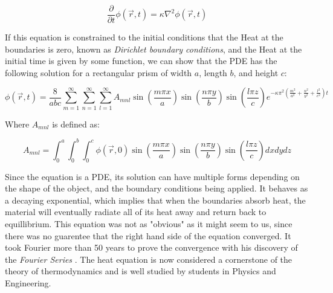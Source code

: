 \documentclass[letterpaper, 12pt]{article}
\begin{document}
         \begin{equation}
            \frac{\partial}{\partial t} \phi (\vec{r}, t) = \kappa \nabla^2 \phi (\vec{r}, t)
         \end{equation}

         If this equation is constrained to the initial conditions that the Heat at the boundaries is zero, known as \textit{Dirichlet boundary conditions}, and the Heat at the initial time is given by some function, we can show that the PDE has the following solution for a rectangular prism of width $a$, length $b$, and height $c$:

         \begin{equation}
            \phi (\vec{r}, t) = \frac{8}{abc} \sum_{m=1}^\infty \sum_{n=1}^\infty \sum_{l = 1}^\infty  A_{mnl} \sin \left( \frac{m \pi x}{a} \right) \sin \left( \frac{n \pi y}{b} \right) \sin \left( \frac{l \pi z}{c} \right) e^{-\kappa \pi^2 \left( \frac{m^2}{a^2} + \frac{n^2}{b^2} + \frac{l^2}{c^2}\right) t}
         \end{equation}

         Where $ A_{mnl}$ is defined as:

         \begin{equation}
            A_{mnl} = \int_0^a \int_0^b \int_0^c \phi (\vec{r}, 0) \sin \left( \frac{m \pi x}{a} \right) \sin \left( \frac{n \pi y}{b} \right) \sin \left( \frac{l \pi z}{c} \right)dx dy dz
         \end{equation}

         Since the equation is a PDE, its solution can have multiple forms depending on the shape of the object, and the boundary conditions being applied. It behaves as a decaying exponential, which implies that when the boundaries absorb heat, the material will eventually radiate all of its heat away and return back to equillibrium. This equation was not as "obvious" as it might seem to us, since there was no guarentee that the right hand side of the equation converged. It took Fourier more than 50 years to prove the convergence with his discovery of the \textit{Fourier Series} \cite{History}. The heat equation is now considered a cornerstone of the theory of thermodynamics and is well studied by students in Physics and Engineering.\\
\end{document}
